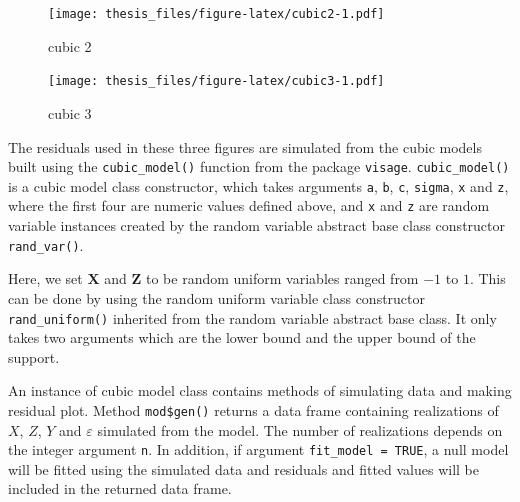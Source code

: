 \documentclass{monashthesis}
\theoremstyle{definition}
\theoremstyle{definition}
\theoremstyle{definition}
\theoremstyle{definition}
\theoremstyle{remark}
\begin{document}
\begin{figure}
\centering
\texttt{[image: thesis\_files/figure-latex/cubic2-1.pdf]}
\caption{\label{fig:cubic2}cubic 2}
\end{figure}

\begin{figure}
\centering
\texttt{[image: thesis\_files/figure-latex/cubic3-1.pdf]}
\caption{\label{fig:cubic3}cubic 3}
\end{figure}

The residuals used in these three figures are simulated from the cubic models built using the \texttt{cubic\_model()} function from the package \texttt{visage}. \texttt{cubic\_model()} is a cubic model class constructor, which takes arguments \texttt{a}, \texttt{b}, \texttt{c}, \texttt{sigma}, \texttt{x} and \texttt{z}, where the first four are numeric values defined above, and \texttt{x} and \texttt{z} are random variable instances created by the random variable abstract base class constructor \texttt{rand\_var()}.

Here, we set \(\boldsymbol{X}\) and \(\boldsymbol{Z}\) to be random uniform variables ranged from \(-1\) to \(1\). This can be done by using the random uniform variable class constructor \texttt{rand\_uniform()} inherited from the random variable abstract base class. It only takes two arguments which are the lower bound and the upper bound of the support.

\begin{Shaded}
\begin{Highlighting}[]
\OtherTok{\textless{}{-}} \NormalTok{(} \SpecialCharTok{{-}}\NormalTok{, } \SpecialCharTok{{-}}\NormalTok{, } \NormalTok{, } \NormalTok{, }
                    \NormalTok{(}\SpecialCharTok{{-}}\NormalTok{, }\NormalTok{), } \NormalTok{(}\SpecialCharTok{{-}}\NormalTok{, }\NormalTok{))}
\end{Highlighting}
\end{Shaded}

An instance of cubic model class contains methods of simulating data and making residual plot. Method \texttt{mod\$gen()} returns a data frame containing realizations of \(X\), \(Z\), \(Y\) and \(\varepsilon\) simulated from the model. The number of realizations depends on the integer argument \texttt{n}. In addition, if argument \texttt{fit\_model\ =\ TRUE}, a null model will be fitted using the simulated data and residuals and fitted values will be included in the returned data frame.
\end{document}
